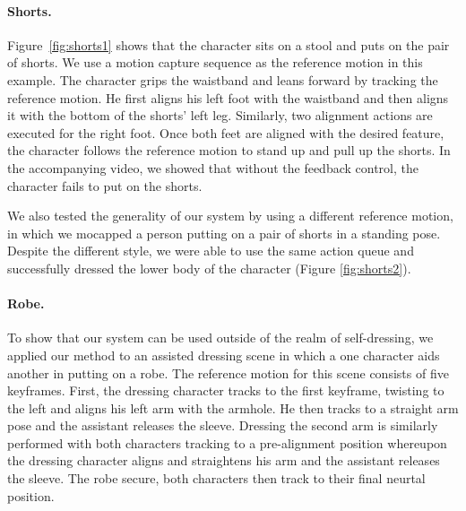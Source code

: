 \paragraph{Shorts.} Figure~\ref{fig:shorts1} shows that the character sits on a stool and puts on the pair of shorts. We use a motion capture sequence as the reference motion in this example. The character grips the waistband and leans forward by tracking the reference motion. He first aligns his left foot with the waistband and then aligns it with the bottom of the shorts' left leg. Similarly, two alignment actions are executed for the right foot. Once both feet are aligned with the desired feature, the character follows the reference motion to stand up and pull up the shorts. In the accompanying video, we showed that without the feedback control, the character fails to put on the shorts.

We also tested the generality of our system by using a different reference motion, in which we mocapped a person putting on a pair of shorts in a standing pose. Despite the different style, we were able to use the same action queue and successfully dressed the lower body of the character (Figure \ref{fig:shorts2}).

\paragraph{Robe.} To show that our system can be used outside of the realm of self-dressing, we applied our method to an assisted dressing scene in which a one character aids another in putting on a robe. The reference motion for this scene consists of five keyframes. First, the dressing character tracks to the first keyframe, twisting to the left and aligns his left arm with the armhole. He then tracks to a straight arm pose and the assistant releases the sleeve. Dressing the second arm is similarly performed with both characters tracking to a pre-alignment position whereupon the dressing character aligns and straightens his arm and the assistant releases the sleeve. The robe secure, both characters then track to their final neurtal position.
